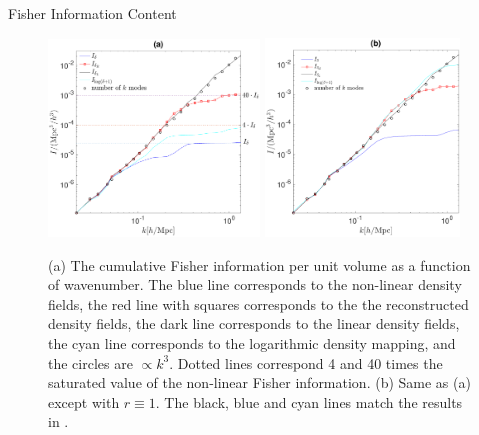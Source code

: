 \begin{section}{Fisher Information Content}
  \begin{figure}
    \includegraphics[width=0.5\textwidth]{fig4a.pdf}
    \includegraphics[width=0.46\textwidth]{fig4b.pdf}
    \centering
    \caption{(a) The cumulative Fisher information per unit volume as
      a function of wavenumber.  The blue line corresponds to the
      non-linear density fields, the red line with squares corresponds
      to the the reconstructed density fields, the dark line
      corresponds to the linear density fields, the cyan line
      corresponds to the logarithmic density mapping, and the circles
      are $\propto k^3$.  Dotted lines correspond 4 and 40 times the
      saturated value of the non-linear Fisher information.  (b) Same
      as (a) except with $r\equiv 1$. The black, blue and cyan lines
      match the results in \cite{bib:Rimes2006,bib:Mark2009}.}
  \label{fig:fisherinfo}
\end{figure}
\end{section}
